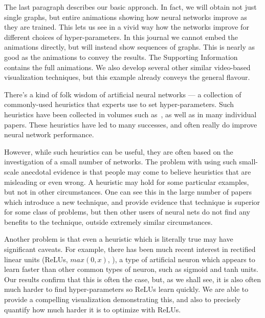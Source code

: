 \documentclass[10pt]{article}
\begin{document}



%
%
The last paragraph describes our basic approach.  In fact, we will
obtain not just single graphs, but entire animations showing how
neural networks improve as they are trained.  This lets us see in a
vivid way how the networks improve for different choices of
hyper-parameters.  In this journal we cannot embed the animations
directly, but will instead show sequences of graphs.  This is nearly
as good as the animations to convey the results.  The Supporting
Information contains the full animations.  We also develop several
other similar video-based visualization techniques, but this example
already conveys the general flavour.

%
%
There's a kind of folk wisdom of artificial neural networks --- a
collection of commonly-used heuristics that experts use to set
hyper-parameters.  Such heuristics have been collected in volumes such
as~\cite{Montavon2012a}, as well as in many individual papers.  These
heuristics have led to many successes, and often really do improve
neural network performance.

%
%
However, while such heuristics can be useful, they are often based on
the investigation of a small number of networks.  The problem with
using such small-scale anecdotal evidence is that people may come to
believe heuristics that are misleading or even wrong.  A heuristic may
hold for some particular examples, but not in other circumstances.
One can see this in the large number of papers which introduce a new
technique, and provide evidence that technique is superior for some
class of problems, but then other users of neural nets do not find any
benefits to the technique, outside extremely similar circumstances.

%
%
Another problem is that even a heuristic which is literally true may
have significant caveats.  For example, there has been much recent
interest in rectified linear units (ReLUs, $max(0,x)$,
\cite{Glorot2010a,Nair2010a,Jarrett2009a}), a type of artificial
neuron which appears to learn faster than other common types of
neuron, such as sigmoid and tanh units. \cite{Krizhevsky2012a} Our
results confirm that this is often the case, but, as we shall see, it
is also often much harder to find hyper-parameters so ReLUs learn
quickly.  We are able to provide a compelling visualization
demonstrating this, and also to precisely quantify how much harder it
is to optimize with ReLUs.
\end{document}
